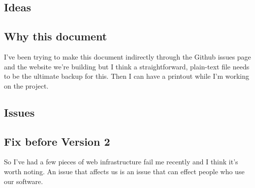 \documentclass[a4paper]{report}
\begin{document}
{{{{{{\subsection{Ideas}

\subsection{Why this document}

I've been trying to make this document indirectly through the Github
issues page and the website we're building but I think a
straightforward, plain-text file needs to be the ultimate backup for
this. Then I can have a printout while I'm working on the project.

\subsection{Issues}

\subsection{Fix before Version 2}

So I've had a few pieces of web infrastructure fail me recently and I
think it's worth noting. An issue that affects us is an issue that can
effect people who use our software.

}}}}}}
\end{document}
